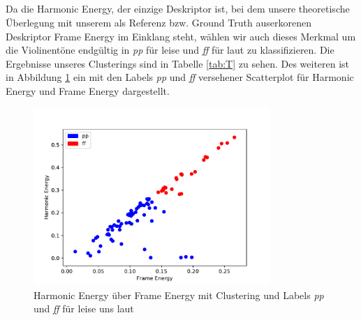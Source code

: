 \subsection{}

Da die Harmonic Energy, der einzige Deskriptor ist, bei dem unsere theoretische Überlegung mit unserem als Referenz bzw. Ground Truth auserkorenen Deskriptor Frame Energy im Einklang steht, wählen wir auch dieses Merkmal um die Violinentöne endgültig in \textit{pp} für leise und \textit{ff} für laut zu klassifizieren. 
Die Ergebnisse unseres Clusterings sind in Tabelle \ref{tab:T} zu sehen.
Des weiteren ist in Abbildung \ref{fig:harmonic_energy_c_l} ein mit den Labels \textit{pp} und \textit{ff} versehener Scatterplot für Harmonic Energy und Frame Energy dargestellt.

\begin{figure}[H]
    \center
    \includegraphics[width = 0.8\textwidth]{Figures/harmonic_energy_c_l}
    \caption{Harmonic Energy über Frame Energy mit Clustering und Labels \textit{pp} und \textit{ff} für leise uns laut}
    \label{fig:harmonic_energy_c_l}
\end{figure}


